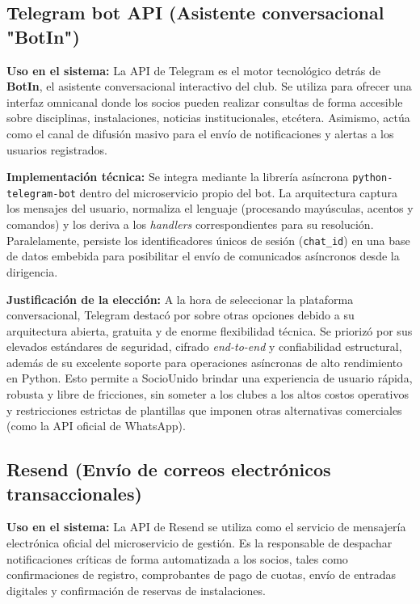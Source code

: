 \subsection{Telegram bot API (Asistente conversacional "BotIn")}

\textbf{Uso en el sistema:} La API de Telegram es el motor tecnológico detrás de \textbf{BotIn}, el asistente conversacional interactivo del club. Se utiliza para ofrecer una interfaz omnicanal donde los socios pueden realizar consultas de forma accesible sobre disciplinas, instalaciones, noticias institucionales, etcétera. Asimismo, actúa como el canal de difusión masivo para el envío de notificaciones y alertas a los usuarios registrados.

\textbf{Implementación técnica:} Se integra mediante la librería asíncrona \texttt{python-telegram-bot} dentro del microservicio propio del bot. La arquitectura captura los mensajes del usuario, normaliza el lenguaje (procesando mayúsculas, acentos y comandos) y los deriva a los \textit{handlers} correspondientes para su resolución. Paralelamente, persiste los identificadores únicos de sesión (\texttt{chat\_id}) en una base de datos embebida para posibilitar el envío de comunicados asíncronos desde la dirigencia.

\textbf{Justificación de la elección:} A la hora de seleccionar la plataforma conversacional, Telegram destacó por sobre otras opciones debido a su arquitectura abierta, gratuita y de enorme flexibilidad técnica. Se priorizó por sus elevados estándares de seguridad, cifrado \textit{end-to-end} y confiabilidad estructural, además de su excelente soporte para operaciones asíncronas de alto rendimiento en Python. Esto permite a SocioUnido brindar una experiencia de usuario rápida, robusta y libre de fricciones, sin someter a los clubes a los altos costos operativos y restricciones estrictas de plantillas que imponen otras alternativas comerciales (como la API oficial de WhatsApp).

\subsection{Resend (Envío de correos electrónicos transaccionales)}

\textbf{Uso en el sistema:} La API de Resend se utiliza como el servicio de mensajería electrónica oficial del microservicio de gestión. Es la responsable de despachar notificaciones críticas de forma automatizada a los socios, tales como confirmaciones de registro, comprobantes de pago de cuotas, envío de entradas digitales y confirmación de reservas de instalaciones.

